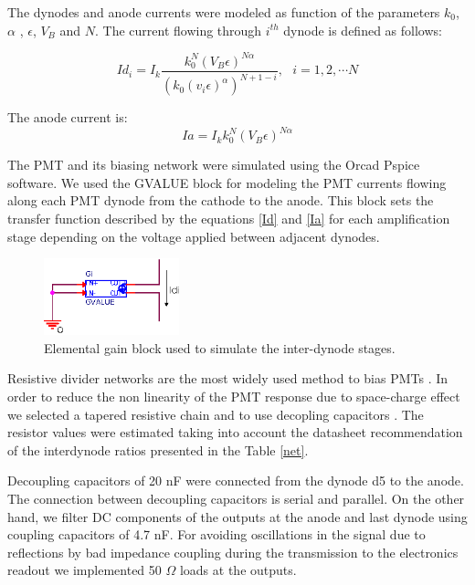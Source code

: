 \documentclass[letterpaper, 10 pt, conference]{ieeeconf}  %
\begin{document}
The dynodes and anode currents were modeled as function of the parameters $k_0$, $\alpha$ , $\epsilon$, $V_B$ and $N$. The current flowing through $i^{th}$ dynode is defined as follows:

\begin{equation}
Id_{i} = I_k \frac{k_0^N (V_B \epsilon)^{N \alpha}}{(k_0 (v_i \epsilon)^\alpha)^{N+1-i}}, \ \ \ i=1,2, \cdots N
\label{Id}
\end{equation}

The anode current is:
\begin{equation}
Ia = I_k k_0^N (V_B \epsilon)^{N \alpha}
\label{Ia}
\end{equation}

The PMT and its biasing network were simulated using the Orcad Pspice software. We used the GVALUE  \cite{Krihely2014} block for modeling the PMT currents flowing along each PMT dynode from the cathode to the anode. This block sets the transfer function described by the equations \ref{Id} and \ref{Ia} for each amplification stage depending on the voltage applied between adjacent dynodes. 

\begin{figure}[h!]
\begin{center}
\includegraphics[width=0.35\textwidth]{Figures/GVALUE}
\caption{Elemental gain block used to simulate the inter-dynode stages.}
\label{Gval}
\end{center}
\end{figure}

Resistive divider networks are the most widely used method to bias PMTs \cite{Camin1999PassiveAA}. In order to reduce the non linearity of the PMT response due to space-charge effect we selected a tapered resistive chain and to use decopling capacitors \cite{Huang_2013}. The resistor values were estimated taking into account the datasheet recommendation of the interdynode ratios presented in the Table \ref{net}. 

Decoupling capacitors of 20 nF were connected from the dynode d5 to the anode. The connection between decoupling capacitors is serial and parallel. On the other hand, we filter DC components of the outputs at the anode and last dynode using coupling capacitors of 4.7 nF. For avoiding oscillations in the signal due to reflections by bad impedance coupling during the transmission to the electronics readout we implemented 50 $\Omega$ loads at the outputs. 
\end{document}
